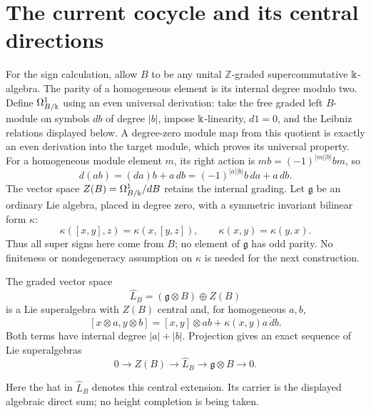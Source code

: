\section{The current cocycle and its central directions}
\label{ce:current}

For the sign calculation, allow $B$ to be any unital
$\mathbb Z$-graded supercommutative $\Bbbk$-algebra.  The parity of a
homogeneous element is its internal degree modulo two.  Define
$\Omega^1_{B/\Bbbk}$ using an even universal derivation: take the free
graded left $B$-module on symbols $db$ of degree $|b|$, impose
$\Bbbk$-linearity, $d1=0$, and the Leibniz relations displayed below.
A degree-zero module map from this quotient is exactly an even
derivation into the target module, which proves its universal property.
For a homogeneous
module element $m$, its right action is $mb=(-1)^{|m||b|}bm$, so
\[
 d(ab)=(da)b+a\,db=(-1)^{|a||b|}b\,da+a\,db.
\]
The vector space $Z(B)=\Omega^1_{B/\Bbbk}/dB$ retains the internal grading.
Let $\mathfrak g$ be an ordinary Lie algebra, placed in degree zero,
with a symmetric invariant bilinear form $\kappa$:
\begin{equation}\label{ce:kappa}
 \kappa([x,y],z)=\kappa(x,[y,z]),\qquad
 \kappa(x,y)=\kappa(y,x).
\end{equation}
Thus all super signs here come from $B$; no element of $\mathfrak g$ has
odd parity.  No finiteness or nondegeneracy assumption on $\kappa$ is
needed for the next construction.

\begin{theorem}
\label{ce:cocycle}
The graded vector space
\[
 \widehat L_B=(\mathfrak g\otimes B)\oplus Z(B)
\]
is a Lie superalgebra with $Z(B)$ central and, for homogeneous $a,b$,
\begin{equation}\label{ce:bracket}
 [x\otimes a,y\otimes b]
 =[x,y]\otimes ab+\kappa(x,y)\overline{a\,db}.
\end{equation}
Both terms have internal degree $|a|+|b|$.  Projection gives an exact
sequence of Lie superalgebras
\[
 0\longrightarrow Z(B)\longrightarrow\widehat L_B
 \longrightarrow\mathfrak g\otimes B\longrightarrow0.
\]
\end{theorem}

Here the hat in $\widehat L_B$ denotes this central extension.
Its carrier is the displayed algebraic direct sum; no height completion
is being taken.

